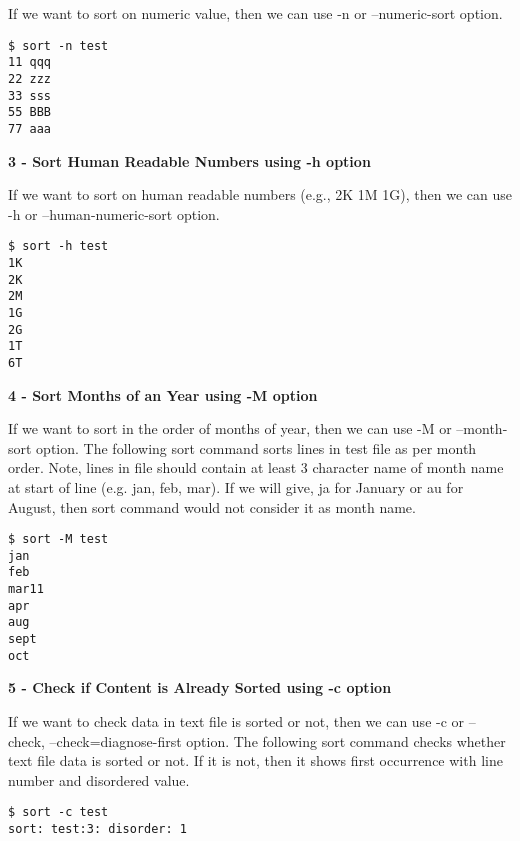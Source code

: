 \documentclass[a4paper,11pt,spanish]{article} %
\newenvironment{myscriptlisting}
{\begin{list}{}{\setlength{\leftmargin}{1em}}\item\scriptsize\bfseries}
{\end{list}}
\begin{document}
If we want to sort on numeric value, then we can use -n or –numeric-sort option.

\begin{myscriptlisting}
 \begin{verbatim}
$ sort -n test
11 qqq
22 zzz
33 sss
55 BBB
77 aaa
 \end{verbatim}
\end{myscriptlisting}

\textbf{3 - Sort Human Readable Numbers using -h option}

If we want to sort on human readable numbers (e.g., 2K 1M 1G), then we can use
-h or –human-numeric-sort option.

\begin{myscriptlisting}
 \begin{verbatim}
$ sort -h test
1K
2K
2M
1G
2G
1T
6T
 \end{verbatim}
\end{myscriptlisting}

\textbf{4 - Sort Months of an Year using -M option}

If we want to sort in the order of months of year, then we can use -M or –month-sort option.
The following sort command sorts lines in test file as per month order. Note, 
lines in file should contain at least 3 character name of month name at start of
line (e.g. jan, feb, mar). If we will give, ja for January or au for August, then 
sort command would not consider it as month name.

\begin{myscriptlisting}
 \begin{verbatim}
$ sort -M test
jan
feb
mar11
apr
aug
sept
oct
 \end{verbatim}
\end{myscriptlisting}

\textbf{5 - Check if Content is Already Sorted using -c option}

If we want to check data in text file is sorted or not, then we can use -c or
–check, –check=diagnose-first option.
The following sort command checks whether text file data is sorted or not. 
If it is not, then it shows first occurrence with line number and disordered value.

\begin{myscriptlisting}
 \begin{verbatim}
$ sort -c test
sort: test:3: disorder: 1
 \end{verbatim}
\end{myscriptlisting}
\end{document}
